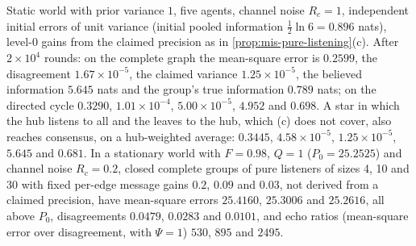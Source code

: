 \begin{numcheck}\label{chk:mis-listening}
Static world with prior variance $1$, five agents, channel noise $R_c=1$, independent initial errors of unit variance (initial pooled information $\tfrac12\ln6=0.896$ nats), level-0 gains from the claimed precision as in \cref{prop:mis-pure-listening}(c). After $2\times10^4$ rounds: on the complete graph the mean-square error is $0.2599$, the disagreement $1.67\times10^{-5}$, the claimed variance $1.25\times10^{-5}$, the believed information $5.645$ nats and the group's true information $0.789$ nats; on the directed cycle $0.3290$, $1.01\times10^{-4}$, $5.00\times10^{-5}$, $4.952$ and $0.698$. A star in which the hub listens to all and the leaves to the hub, which (c) does not cover, also reaches consensus, on a hub-weighted average: $0.3445$, $4.58\times10^{-5}$, $1.25\times10^{-5}$, $5.645$ and $0.681$. In a stationary world with $F=0.98$, $Q=1$ ($P_0=25.2525$) and channel noise $R_c=0.2$, closed complete groups of pure listeners of sizes 4, 10 and 30 with fixed per-edge message gains $0.2$, $0.09$ and $0.03$, not derived from a claimed precision, have mean-square errors $25.4160$, $25.3006$ and $25.2616$, all above $P_0$, disagreements $0.0479$, $0.0283$ and $0.0101$, and echo ratios (mean-square error over disagreement, with $\Psi=1$) $530$, $895$ and $2495$.
\end{numcheck}

